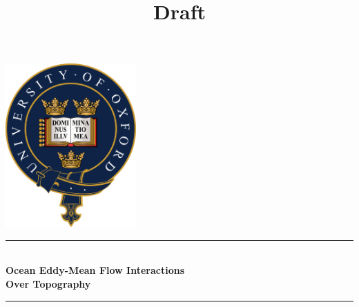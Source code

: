 \documentclass[12pt,a4paper]{report}
\title{Draft}
\begin{document}
\begin{titlepage}
	
	\newcommand{\HRule}{\rule{\linewidth}{0.5mm}} %
	
	\center %
	
	
	
	\includegraphics[width=5cm]{oxcrest}\\[1cm] %
	
	
	
	
	\HRule \\[0.4cm]
	{ \LARGE \bfseries Ocean Eddy-Mean Flow
		Interactions }\\
	{ \LARGE \bfseries Over Topography}\\[0.3cm] %
	\HRule \\[1.2cm]
	
	
	

\end{titlepage}
\end{document}
